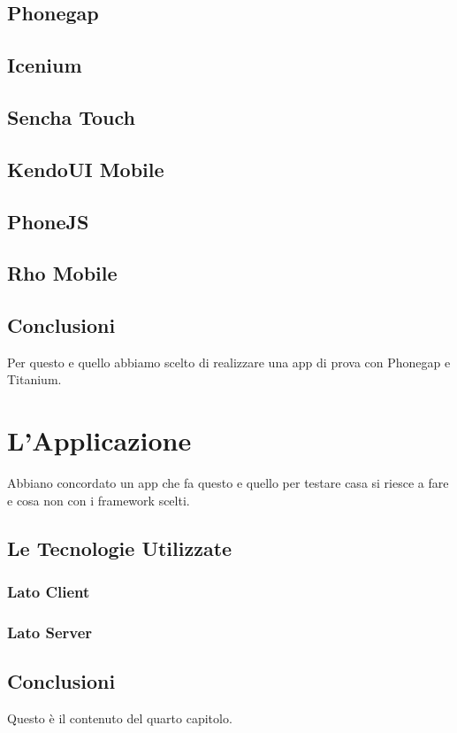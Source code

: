 	\section{Phonegap}
	\section{Icenium}
	\section{Sencha Touch}
	\section{KendoUI Mobile}
	\section{PhoneJS}
	\section{Rho Mobile}
	\section{Conclusioni}
		Per questo e quello abbiamo scelto di realizzare una app di prova con
		Phonegap e Titanium.


\chapter{L'Applicazione}
	Abbiano concordato un app che fa questo e quello per testare casa si riesce a
	fare e cosa non con i framework scelti.
	\section{Le Tecnologie Utilizzate}
		\subsection{Lato Client}
		\subsection{Lato Server}
	
	\section{Conclusioni}
	Questo è il contenuto del quarto capitolo.
